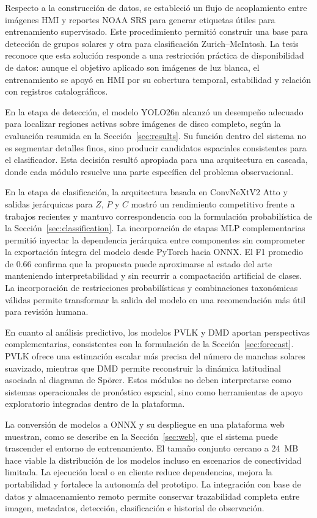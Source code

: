 Respecto a la construcción de datos, se estableció un flujo de acoplamiento entre
imágenes HMI y reportes NOAA SRS para generar etiquetas útiles para entrenamiento
supervisado. Este procedimiento permitió construir una base para detección de
grupos solares y otra para clasificación Zurich--McIntosh. La tesis reconoce que
esta solución responde a una restricción práctica de disponibilidad de datos:
aunque el objetivo aplicado son imágenes de luz blanca, el entrenamiento se apoyó
en HMI por su cobertura temporal, estabilidad y relación con registros
catalográficos.

En la etapa de detección, el modelo YOLO26n alcanzó un desempeño adecuado para
localizar regiones activas sobre imágenes de disco completo, según la evaluación
resumida en la Sección~\ref{sec:results}. Su función dentro
del sistema no es segmentar detalles finos, sino producir candidatos espaciales
consistentes para el clasificador. Esta decisión resultó apropiada para una
arquitectura en cascada, donde cada módulo resuelve una parte específica del
problema observacional.

En la etapa de clasificación, la arquitectura basada en ConvNeXtV2 Atto y salidas
jerárquicas para $Z$, $P$ y $C$ mostró un rendimiento competitivo frente a
trabajos recientes y mantuvo correspondencia con la formulación probabilística de
la Sección~\ref{sec:classification}. La incorporación de etapas MLP
complementarias permitió inyectar la dependencia jerárquica entre componentes sin
comprometer la exportación íntegra del modelo desde PyTorch hacia ONNX. El F1
promedio de 0.66 confirma que la propuesta puede
aproximarse al estado del arte manteniendo interpretabilidad y sin recurrir a
compactación artificial de clases. La incorporación de restricciones
probabilísticas y combinaciones taxonómicas válidas permite transformar la salida
del modelo en una recomendación más útil para revisión humana.

En cuanto al análisis predictivo, los modelos PVLK y DMD aportan perspectivas
complementarias, consistentes con la formulación de la Sección~\ref{sec:forecast}. PVLK ofrece una estimación escalar más precisa del número de
manchas solares suavizado, mientras que DMD permite reconstruir la dinámica
latitudinal asociada al diagrama de Spörer. Estos módulos no deben interpretarse
como sistemas operacionales de pronóstico espacial, sino como herramientas de
apoyo exploratorio integradas dentro de la plataforma.

La conversión de modelos a ONNX y su despliegue en una plataforma web muestran,
como se describe en la Sección~\ref{sec:web}, que el sistema puede trascender el
entorno de entrenamiento. El tamaño conjunto cercano a 24~MB hace viable la
distribución de los modelos incluso en escenarios de conectividad limitada. La
ejecución local o en cliente reduce dependencias, mejora la portabilidad y
fortalece la autonomía del prototipo. La integración con base de datos y
almacenamiento remoto permite
conservar trazabilidad completa entre imagen, metadatos, detección,
clasificación e historial de observación.

